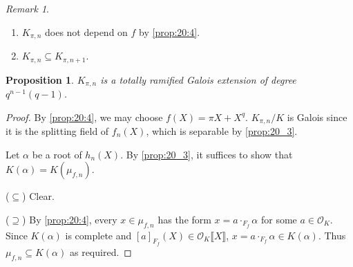 \documentclass[11pt]{article}
\theoremstyle{definition}
\theoremstyle{plain}
\newtheorem{proposition}[definition]{Proposition}
\theoremstyle{remark}
\newtheorem*{remark}{Remark}
\newcommand{\cO}{\mathcal{O}}
\begin{document}
\begin{remark}\phantom{}
    \begin{enumerate}
        \item $K_{\pi,n}$ does not depend on $f$ by \autoref{prop:20:4}.
        \item $K_{\pi, n} \subseteq K_{\pi, n+1}$.
    \end{enumerate}
\end{remark}

\begin{proposition}\label{prop:20_6}
    $K_{\pi,n}$ is a totally ramified Galois extension of degree $q^{n-1} (q-1)$.
\end{proposition}
\begin{proof}
    By \autoref{prop:20:4}, we may choose $f(X) = \pi X + X^q$. $K_{\pi,n}/K$ is Galois since it is the splitting field of $f_n(X)$, which is separable by \autoref{prop:20_3}.

    Let $\alpha$ be a root of $h_n(X)$. By \autoref{prop:20_3}, it suffices to show that $K(\alpha) = K(\mu_{f,n})$.

    \noindent ($\subseteq$) Clear.

    \noindent ($\supseteq$) By \autoref{prop:20:4}, every $x \in \mu_{f,n}$ has the form $x = a \cdot_{F_f} \alpha$ for some $a \in \cO_K$. Since $K(\alpha)$ is complete and $[a]_{F_f}(X) \in \cO_K \llbracket X \rrbracket$, $x = a \cdot_{F_f} \alpha \in K(\alpha)$. Thus $\mu_{f, n} \subseteq K(\alpha)$ as required.
\end{proof}
\end{document}
